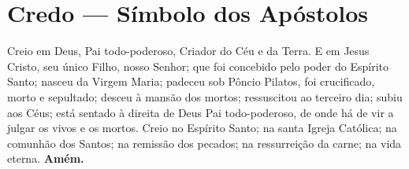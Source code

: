 \section*{Credo --- Símbolo dos Apóstolos}
Creio em Deus, Pai todo-poderoso, Criador do Céu e da Terra.
E em Jesus Cristo, seu único Filho, nosso Senhor;
que foi concebido pelo poder do Espírito Santo;
nasceu da Virgem Maria; 
padeceu sob Pôncio Pilatos, 
foi crucificado, morto e sepultado; 
desceu à mansão dos mortos; 
ressuscitou ao terceiro dia; 
subiu aos Céus; 
está sentado à direita de Deus Pai todo-poderoso, 
de onde há de vir a julgar os vivos e os mortos.
Creio no Espírito Santo; 
na santa Igreja Católica; 
na comunhão dos Santos; 
na remissão dos pecados; 
na ressurreição da carne; 
na vida eterna. \textbf{Amém.}
